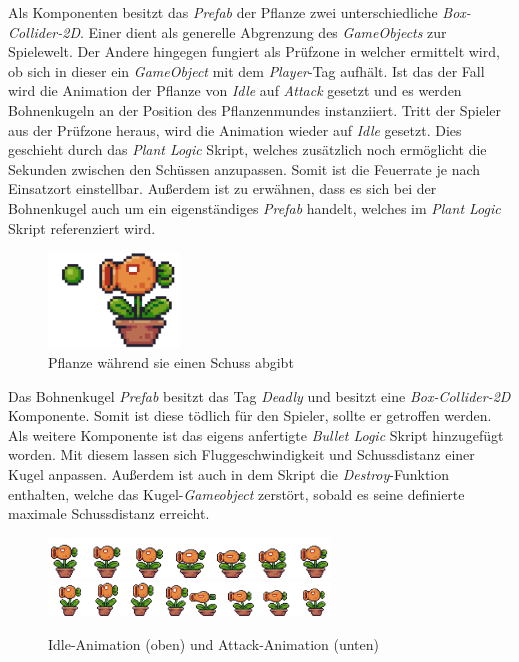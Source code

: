 Als Komponenten besitzt das \textit{Prefab} der Pflanze zwei unterschiedliche \textit{Box-Collider-2D}. Einer dient als generelle Abgrenzung des \textit{GameObjects} zur Spielewelt. Der Andere hingegen fungiert als Prüfzone in welcher ermittelt wird, ob sich in dieser ein \textit{GameObject} mit dem \textit{Player}-Tag aufhält. Ist das der Fall wird die Animation der Pflanze von \textit{Idle} auf \textit{Attack} gesetzt und es werden Bohnenkugeln an der Position des Pflanzenmundes instanziiert. Tritt der Spieler aus der Prüfzone heraus, wird die Animation wieder auf \textit{Idle} gesetzt. Dies geschieht durch das \textit{Plant Logic} Skript, welches zusätzlich noch ermöglicht die Sekunden zwischen den Schüssen anzupassen. Somit ist die Feuerrate je nach Einsatzort einstellbar. Außerdem ist zu erwähnen, dass es sich bei der Bohnenkugel auch um ein eigenständiges \textit{Prefab} handelt, welches im \textit{Plant Logic} Skript referenziert wird.\\

\begin{figure}[th]
\centering
\includegraphics[width=35mm]{Figures/plant-attack.png}
\decoRule
\caption[Plant Attack Animation]{Pflanze während sie einen Schuss abgibt}
\label{fig:plant-attack}
\end{figure}

Das Bohnenkugel \textit{Prefab} besitzt das Tag \textit{Deadly} und besitzt eine \textit{Box-Collider-2D} Komponente. Somit ist diese tödlich für den Spieler, sollte er getroffen werden. Als weitere Komponente ist das eigens anfertigte \textit{Bullet Logic} Skript hinzugefügt worden. Mit diesem lassen sich Fluggeschwindigkeit und Schussdistanz einer Kugel anpassen. Außerdem ist auch in dem Skript die \textit{Destroy}-Funktion enthalten, welche das Kugel-\textit{Gameobject} zerstört, sobald es seine definierte maximale Schussdistanz erreicht.\\

\begin{figure}[th]
\centering
\includegraphics[width=75mm]{Figures/plant_idle_anim.png}
\\
\includegraphics[width=75mm]{Figures/plant_attack_anim.png}
\decoRule
\caption[Animationen der Pflanze]{Idle-Animation (oben) und Attack-Animation (unten)}
\label{fig:plant-idle-attack}
\end{figure}
\newpage
